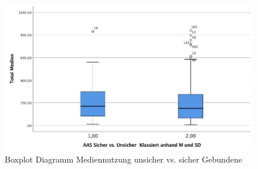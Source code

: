 \begin{figure}[h]
  \centering
     \includegraphics[scale=0.4]{content/Grafik/Boxplot_TotalMedien_SicherUnsicherGebunden.jpg}
  \caption{Boxplot Diagramm Mediennutzung unsicher vs. sicher Gebundene}
  \label{fig:AppBoxplotDiagrammSicherUnsicherGebunden}
\end{figure}